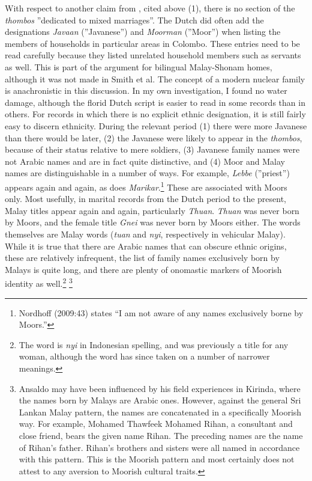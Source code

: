 With respect to another claim from \citet{Ansaldo2008genesis}, cited above (1), there is no section of the \textit{thombos }''dedicated to mixed marriages''. The Dutch did often add the designations \textit{Javaan} (''Javanese'') and \textit{Moorman} (''Moor'') when listing the members of households in particular areas in Colombo. These entries need to be read carefully because they listed unrelated household members such as servants as well. This is part of the argument for bilingual Malay-Shonam homes, although it was not made in Smith et al. The concept of a modern nuclear family is anachronistic in this discussion. In my own investigation, I found no water damage, although the florid Dutch script is easier to read in some records than in others. For records in which there is no explicit ethnic designation, it is still fairly easy to discern ethnicity. During the relevant period (1) there were more Javanese than there would be later, (2) the Javanese were likely to appear in the \textit{thombos}, because of their status relative to mere soldiers, (3) Javanese family names were not Arabic names and are in fact quite distinctive, and (4) Moor and Malay names are distinguishable in a number of ways. For example, \textit{Lebbe} (''priest'') appears again and again, as does \textit{Marikar}.\footnote{Nordhoff
  (2009:43) states ``I am not aware of any names exclusively borne by Moors.''
} These are associated with Moors only. Most usefully, in marital records from the Dutch period to the present, Malay titles appear again and again, particularly \textit{Thuan}. \textit{Thuan} was never born by Moors, and the female title \textit{Gnei} was never born by Moors either. The words themselves are Malay words (\textit{tuan} and \textit{nyi}, respectively in vehicular Malay). While it is true that there are Arabic names that can obscure ethnic origins, these are relatively infrequent, the list of family names exclusively born by Malays is quite long, and there are plenty of onomastic markers of Moorish identity as well.\footnote{The
  word is \textit{nyi} in Indonesian spelling, and was previously a title for any woman, although the word has since taken on a number of narrower meanings.
} 
\footnote{Ansaldo
  may have been influenced by his field experiences in Kirinda, where the names born by Malays are Arabic ones. However, against the general Sri Lankan Malay pattern, the names are concatenated in a specifically Moorish way. For example, Mohamed Thawfeek Mohamed Rihan, a consultant and close friend,  bears the given name Rihan. The preceding names are the name of Rihan's father. Rihan's brothers and sisters were all named in accordance with this pattern. This is the Moorish pattern and most certainly does not attest to any aversion to Moorish cultural traits.
}

